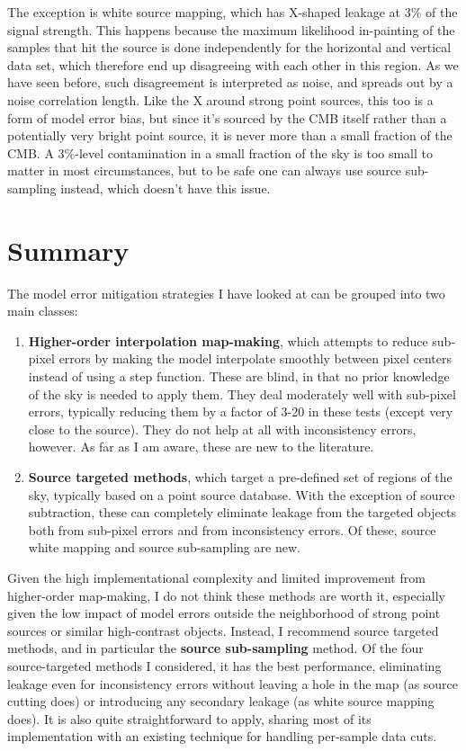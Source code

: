 \documentclass{article}
\newcommand{\dfn}[1]{\textbf{#1}}
\begin{document}
The exception is white
source mapping, which has X-shaped leakage at 3\% of the signal strength.
This happens because the
maximum likelihood in-painting of the samples that hit the source is done independently
for the horizontal and vertical data set, which therefore end up disagreeing with
each other in this region. As we have seen before, such disagreement is interpreted
as noise, and spreads out by a noise correlation length. Like the X around strong
point sources, this too is a form of model error bias, but since it's sourced by
the CMB itself rather than a potentially very bright point source, it is never
more than a small fraction of the CMB. A 3\%-level contamination in a small fraction
of the sky is too small to matter in most circumstances, but to be safe one can
always use source sub-sampling instead, which doesn't have this issue.

\section{Summary}
The model error mitigation strategies I have looked at can be grouped into two main classes:
\begin{enumerate}
	\item \dfn{Higher-order interpolation map-making}, which attempts to reduce sub-pixel errors by
		making the model interpolate smoothly between pixel centers instead of using a step function.
		These are blind, in that no prior knowledge of the sky is needed to apply them. They deal
		moderately well with sub-pixel errors, typically reducing them by a factor of 3-20
		in these tests
		(except very close to the source). They do not help at all with inconsistency errors, however.
		As far as I am aware, these are new to the literature.
	\item \dfn{Source targeted methods}, which target a pre-defined set of regions of the sky, typically
		based on a point source database. With the exception of source subtraction, these can completely
		eliminate leakage from the targeted objects both from sub-pixel errors and from inconsistency
		errors. Of these, source white mapping and source sub-sampling are new.
\end{enumerate}
Given the high implementational complexity and limited improvement from higher-order map-making,
I do not think these methods are worth it, especially given the low impact of model errors outside
the neighborhood of strong point sources or similar high-contrast objects. Instead, I recommend
source targeted methods, and in particular the \dfn{source sub-sampling} method. Of the four source-targeted
methods I considered, it has the best performance, eliminating leakage even for inconsistency errors
without leaving a hole in the map (as source cutting does) or introducing any secondary leakage
(as white source mapping does). It is also quite straightforward to apply, sharing most of its
implementation with an existing technique for handling per-sample data cuts.
\end{document}
